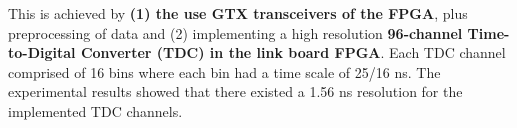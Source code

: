 
\hfill

This is achieved by \textbf{(1) the use GTX transceivers of the FPGA}, plus preprocessing of data and (2) implementing a high resolution \textbf{96-channel Time-to-Digital Converter (TDC) in the link board FPGA}. Each TDC channel comprised of 16 bins where each bin had a time scale of 25/16 ns. The experimental results showed that there existed a 1.56 ns resolution for the implemented TDC channels. 








